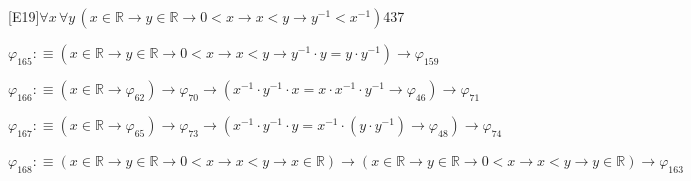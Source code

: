 \begin{fullproof}{[E19]}{$\forall x\,\forall y\,(x \in \mathbb{R} \to y \in \mathbb{R} \to 0 < x \to x < y \to y^{-1} < x^{-1})$}{437}
\begin{abbrevlist}
\item $\varphi_{165} :\equiv (x \in \mathbb{R} \to y \in \mathbb{R} \to 0 < x \to x < y \to y^{-1} \cdot y = y \cdot y^{-1}) \to \varphi_{159}$
\item $\varphi_{166} :\equiv (x \in \mathbb{R} \to \varphi_{62}) \to \varphi_{70} \to (x^{-1} \cdot y^{-1} \cdot x = x \cdot x^{-1} \cdot y^{-1} \to \varphi_{46}) \to \varphi_{71}$
\item $\varphi_{167} :\equiv (x \in \mathbb{R} \to \varphi_{65}) \to \varphi_{73} \to (x^{-1} \cdot y^{-1} \cdot y = x^{-1} \cdot (y \cdot y^{-1}) \to \varphi_{48}) \to \varphi_{74}$
\item $\varphi_{168} :\equiv (x \in \mathbb{R} \to y \in \mathbb{R} \to 0 < x \to x < y \to x \in \mathbb{R}) \to (x \in \mathbb{R} \to y \in \mathbb{R} \to 0 < x \to x < y \to y \in \mathbb{R}) \to \varphi_{163}$
\end{abbrevlist}
\end{fullproof}
